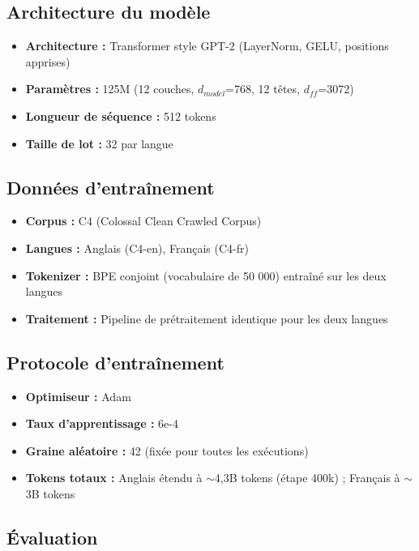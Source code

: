 \documentclass[11pt,a4paper]{article}
\begin{document}
\subsection{Architecture du modèle}

\begin{itemize}
    \item \textbf{Architecture :} Transformer style GPT-2 (LayerNorm, GELU, positions apprises)
    \item \textbf{Paramètres :} 125M (12 couches, $d_{model}$=768, 12 têtes, $d_{ff}$=3072)
    \item \textbf{Longueur de séquence :} 512 tokens
    \item \textbf{Taille de lot :} 32 par langue
\end{itemize}

\subsection{Données d'entraînement}

\begin{itemize}
    \item \textbf{Corpus :} C4 (Colossal Clean Crawled Corpus)
    \item \textbf{Langues :} Anglais (C4-en), Français (C4-fr)
    \item \textbf{Tokenizer :} BPE conjoint (vocabulaire de 50 000) entraîné sur les deux langues
    \item \textbf{Traitement :} Pipeline de prétraitement identique pour les deux langues
\end{itemize}

\subsection{Protocole d'entraînement}

\begin{itemize}
    \item \textbf{Optimiseur :} Adam
    \item \textbf{Taux d'apprentissage :} 6e-4
    \item \textbf{Graine aléatoire :} 42 (fixée pour toutes les exécutions)
    \item \textbf{Tokens totaux :} Anglais étendu à $\sim$4,3B tokens (étape 400k) ; Français à $\sim$3B tokens
\end{itemize}

\subsection{Évaluation}
\end{document}
